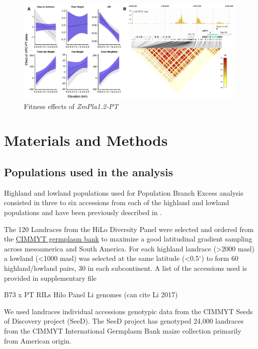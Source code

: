 \documentclass[9pt,twocolumn,twoside,lineno]{gsajnl}
\begin{document}
\begin{figure}[!ht]
\begin{center}
\includegraphics[width=0.8\paperwidth]{Figures/Fig_5.png}
\caption{Fitness effects of \textit{ZmPla1.2-PT}} 
\label{Fig5}
\end{center}
\end{figure}   


\section{Materials and Methods}
\label{sec:materials:methods}

\subsection{Populations used in the analysis } 
Highland and lowland populations used for Population Branch Excess analysis consisted in three to six accessions from each of the highland and lowland populations and have been previously described in \cite{Wang2020-mp, Wang2017-bc}. 


The 120 Landraces from the HiLo Diversity Panel were selected and ordered from the \href{http://mgb.cimmyt.org/gringlobal/search.aspx}{CIMMYT germplasm bank} to maximize a good latitudinal gradient sampling across mesoamerica and South America. For each highland landrace (>2000 masl) a lowland (<1000 masl) was selected at the same latitude (<0.5$^{\circ}$) to form 60 highland/lowland pairs, 30 in each subcontinent. A list of the accessions used is provided in supplementary file  


B73 x PT RILs
Hilo Panel
Li genomes (can cite Li 2017)

We used landraces individual accessions genotypic data from the CIMMYT Seeds of Discovery project (SeeD). The SeeD project has genotyped 24,000 landraces from the  CIMMYT International Germplasm Bank maize collection primarily from American origin.
\end{document}
